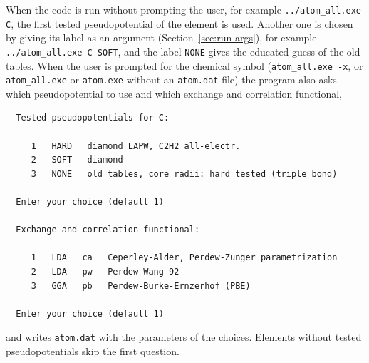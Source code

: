 \documentclass[11pt]{article}
\begin{document}
When the code is run without prompting the user, for example
\texttt{../atom\_all.exe C}, the first tested pseudopotential of the element is used.
Another one is chosen by giving its label as an argument
(Section~\ref{sec:run-args}), for example \texttt{../atom\_all.exe C SOFT},
and the label \texttt{NONE} gives the educated guess of the old tables.
When the user is prompted for the chemical symbol
(\texttt{atom\_all.exe -x}, or \texttt{atom\_all.exe} or \texttt{atom.exe}
without an \texttt{atom.dat} file) the program also asks which pseudopotential to use
and which exchange and correlation functional,
\begin{verbatim}
  Tested pseudopotentials for C:

     1   HARD   diamond LAPW, C2H2 all-electr.
     2   SOFT   diamond
     3   NONE   old tables, core radii: hard tested (triple bond)

  Enter your choice (default 1)

  Exchange and correlation functional:

     1   LDA   ca   Ceperley-Alder, Perdew-Zunger parametrization
     2   LDA   pw   Perdew-Wang 92
     3   GGA   pb   Perdew-Burke-Ernzerhof (PBE)

  Enter your choice (default 1)
\end{verbatim}
and writes \texttt{atom.dat} with the parameters of the choices.
Elements without tested pseudopotentials skip the first question.
\end{document}
